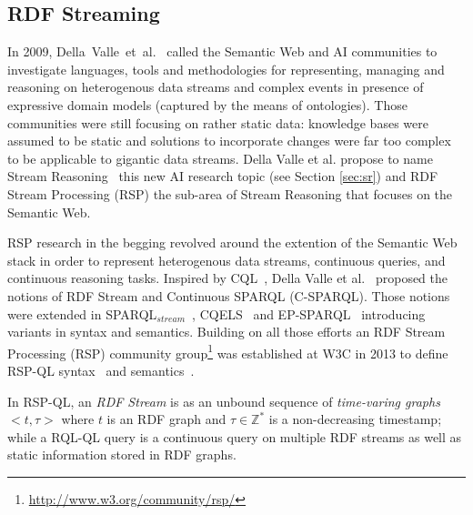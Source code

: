 \subsection{RDF Streaming}\label{sec:rdf} %


In 2009, Della~Valle~et~al.~\cite{DBLP:journals/expert/ValleCHF09} called the Semantic Web and AI communities to investigate languages, tools and methodologies for representing, managing and reasoning on heterogenous data streams and complex events in presence of expressive domain models (captured by the means of ontologies). Those communities were still focusing on rather static data: knowledge bases were assumed to be static and solutions to incorporate changes were far too complex to be applicable to gigantic data streams. 
Della Valle et al. propose to name Stream Reasoning~\cite{DellAglioDataScience2017}  this new AI research topic (see Section \ref{sec:sr}) and RDF Stream Processing (RSP) \cite{DBLP:conf/debs/ValleDM16} the sub-area of Stream Reasoning that focuses on the Semantic Web.


\sloppy RSP research in the begging revolved around the extention of the Semantic Web stack \cite{DBLP:books/daglib/0036180} in order to represent heterogenous data streams, continuous queries, and continuous reasoning tasks. Inspired by CQL~\cite{arasu_widom_2004}, Della Valle et al.~\cite{DBLP:conf/fis/ValleCBBC08} proposed the notions of RDF Stream and Continuous SPARQL (C-SPARQL). Those notions were extended in SPARQL$_{stream}$~\cite{Calbimonte2010}, CQELS~\cite{LePhuoc2012c} and EP-SPARQL~\cite{DBLP:journals/semweb/AnicicRFS12} introducing variants in syntax and semantics. Building on all those efforts an RDF Stream Processing (RSP) community group\footnote{\url{http://www.w3.org/community/rsp/}} was established at W3C in 2013  to define RSP-QL syntax~\cite{DBLP:conf/esws/DellAglioCVC15} and semantics~\cite{DBLP:journals/ijswis/DellAglioVCC14}.

In RSP-QL, an \textit{RDF Stream} is as an unbound sequence of \emph{time-varing graphs} $< t,\tau>$ where $t$ is an RDF graph and $\tau \in \mathbb{Z}^{*}$ is a non-decreasing timestamp; while a RQL-QL query is a continuous query on multiple RDF streams as well as static information stored in RDF graphs. 

